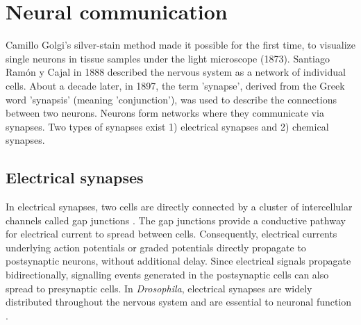 
\section{Neural communication}
Camillo Golgi's silver-stain method made it possible for the first time, to visualize single neurons in tissue samples under the light microscope (1873). Santiago Ramón y Cajal in 1888 described the nervous system as a network of individual cells. About a decade later, in 1897, the term 'synapse', derived from the Greek word 'synapsis' (meaning 'conjunction'), was used to describe the connections between two neurons. Neurons form networks where they communicate via synapses. Two types of synapses exist 1) electrical synapses and 2) chemical synapses.

\subsection{Electrical synapses}
In electrical synapses, two cells are directly connected by a cluster of intercellular channels called gap junctions \parencite{Bennett2004}. The gap junctions provide a conductive pathway for electrical current to spread between cells. Consequently, electrical currents underlying action potentials or graded potentials directly propagate to postsynaptic neurons, without additional delay. Since electrical signals propagate bidirectionally, signalling events generated in the postsynaptic cells can also spread to presynaptic cells. In \textit{Drosophila}, electrical synapses are widely distributed throughout the nervous system and are essential to neuronal function \parencite{Ammer2022, Stebbings2002, Liu2016}.

